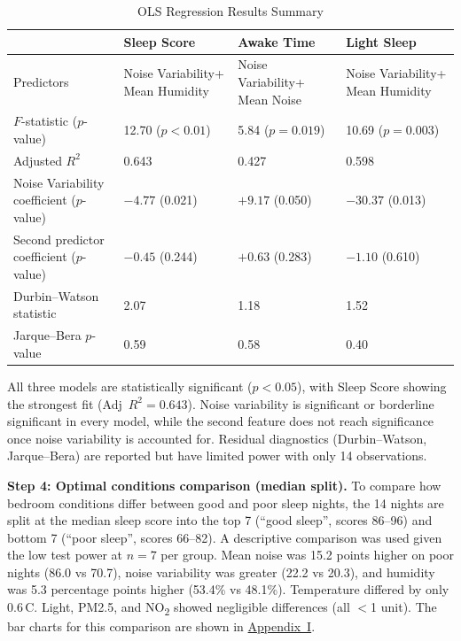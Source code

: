 \documentclass[10pt,a4paper]{extarticle}
\begin{document}
\begin{table}[H]
\centering
\caption{OLS Regression Results Summary}
\label{tab:regression}
\scriptsize
\begin{tabularx}{\textwidth}{p{3.8cm} X X X}
\toprule
 & \textbf{Sleep Score} & \textbf{Awake Time} & \textbf{Light Sleep} \\
\midrule
Predictors & Noise Variability\newline + Mean Humidity & Noise Variability\newline + Mean Noise & Noise Variability\newline + Mean Humidity \\
\midrule
$F$-statistic ($p$-value) & 12.70 ($p < 0.01$) & 5.84 ($p = 0.019$) & 10.69 ($p = 0.003$) \\
\midrule
Adjusted $R^2$ & 0.643 & 0.427 & 0.598 \\
\midrule
Noise Variability coefficient ($p$-value) & $-4.77$ (0.021) & $+9.17$ (0.050) & $-30.37$ (0.013) \\
\midrule
Second predictor coefficient ($p$-value) & $-0.45$ (0.244) & $+0.63$ (0.283) & $-1.10$ (0.610) \\
\midrule
Durbin--Watson statistic & 2.07 & 1.18 & 1.52 \\
\midrule
Jarque--Bera $p$-value & 0.59 & 0.58 & 0.40 \\
\bottomrule
\end{tabularx}
\end{table}

All three models are statistically significant ($p < 0.05$), with Sleep Score showing the strongest fit (Adj~$R^2 = 0.643$). Noise variability is significant or borderline significant in every model, while the second feature does not reach significance once noise variability is accounted for. Residual diagnostics (Durbin--Watson, Jarque--Bera) are reported but have limited power with only 14 observations.

\textbf{Step 4: Optimal conditions comparison (median split).} To compare how bedroom conditions differ between good and poor sleep nights, the 14 nights are split at the median sleep score into the top 7 (``good sleep'', scores 86--96) and bottom 7 (``poor sleep'', scores 66--82). A descriptive comparison was used given the low test power at $n = 7$ per group. Mean noise was 15.2 points higher on poor nights (86.0 vs 70.7), noise variability was greater (22.2 vs 20.3), and humidity was 5.3 percentage points higher (53.4\% vs 48.1\%). Temperature differed by only 0.6\,\textdegree C. Light, PM2.5, and NO\textsubscript{2} showed negligible differences (all $<$1 unit). The bar charts for this comparison are shown in \hyperref[app:I]{Appendix~I}.
\end{document}

